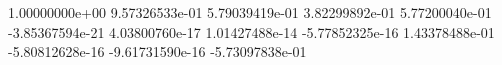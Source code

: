  1.00000000e+00
 9.57326533e-01
 5.79039419e-01
 3.82299892e-01
 5.77200040e-01
 -3.85367594e-21
 4.03800760e-17
 1.01427488e-14
 -5.77852325e-16
 1.43378488e-01
 -5.80812628e-16
 -9.61731590e-16
 -5.73097838e-01
